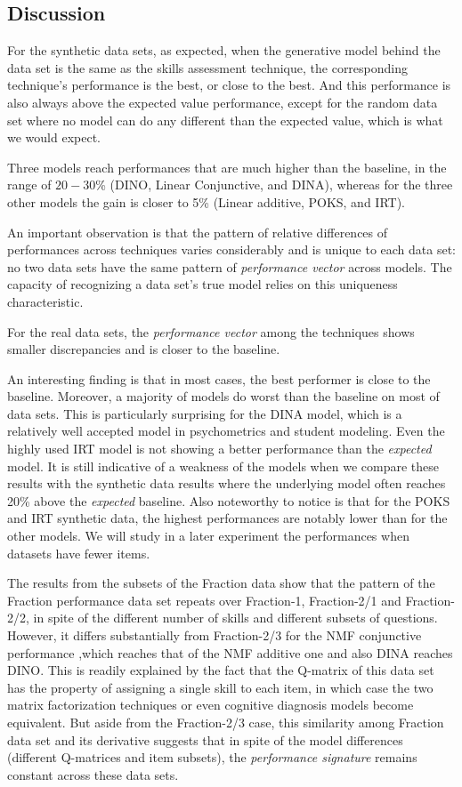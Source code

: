 \subsection{Discussion}

For the synthetic data sets, as expected, when the generative model behind the data set is the same as the skills assessment technique, the corresponding technique's performance is the best, or close to the best.  And this performance is also always above the expected value performance, except for the random data set where no model can do any different than the expected value, which is what we would expect.

Three models reach performances that are much higher than the baseline, in the range of $20-30$\% (DINO, Linear Conjunctive, and DINA), whereas for the three other models the gain is closer to 5\% (Linear additive, POKS, and IRT).

An important observation is that the pattern of relative differences of performances across techniques varies considerably and is unique to each data set: no two data sets have the same pattern of \textit{performance vector} across models.  The capacity of recognizing a data set's true model relies on this uniqueness characteristic.

For the real data sets, the \textit{performance vector} among the techniques shows smaller discrepancies and is closer to the baseline. 

An interesting finding is that in most cases, the best performer is close to the baseline. Moreover, a majority of models do worst than the baseline on most of data sets. This is particularly surprising for the DINA model, which is a relatively well accepted model in psychometrics and student modeling.  Even the highly used IRT model is not showing a better performance than the \textit{expected} model. It is still indicative of a weakness of the models when we compare these results with the synthetic data results where the underlying model often reaches 20\% above the \textit{expected} baseline.  Also noteworthy to notice is that for the POKS and IRT synthetic data, the highest performances are notably lower than for the other models. We will study in a later experiment the performances when datasets have fewer items.

The results from the subsets of the Fraction data show that the pattern of the Fraction performance data set repeats over Fraction-1, Fraction-2/1 and Fraction-2/2, in spite of the different number of skills and different subsets of questions.  However, it differs substantially from Fraction-2/3 for the NMF conjunctive performance ,which reaches that of the NMF additive one and also DINA reaches DINO. This is readily explained by the fact that the Q-matrix of this data set has the property of assigning a single skill to each item, in which case the two matrix factorization techniques or even cognitive diagnosis models become equivalent.  But aside from the Fraction-2/3 case, this similarity among Fraction data set and its derivative suggests that in spite of the model differences (different Q-matrices and item subsets), the \textit{performance signature} remains constant across these data sets.

